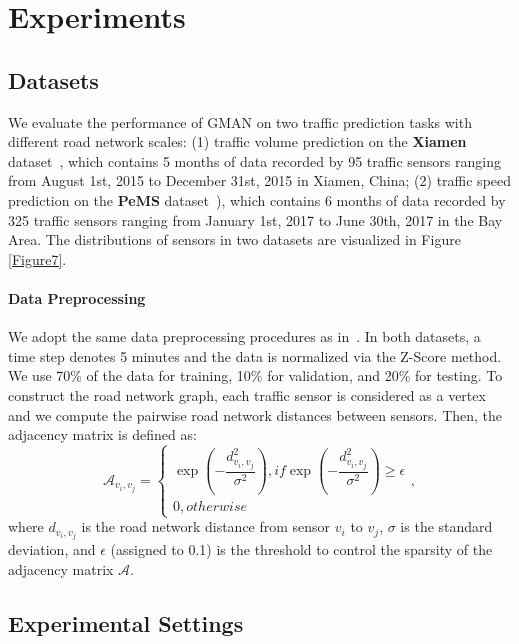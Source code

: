 \documentclass[letterpaper]{article} \usepackage{aaai20}  \usepackage{times}  \usepackage{helvet} \usepackage{courier}  \usepackage[hyphens]{url}  \usepackage{graphicx} \usepackage{amsmath}
\begin{document}
\section{Experiments}

\subsection{Datasets} \label{datasets}

We evaluate the performance of GMAN on two traffic prediction tasks with different road network scales: (1) traffic volume prediction on the \textbf{Xiamen} dataset~\cite{Wang-et-al:ICWS2017}, which contains 5 months of data recorded by 95 traffic sensors ranging from August 1st, 2015 to December 31st, 2015 in Xiamen, China; (2) traffic speed prediction on the \textbf{PeMS} dataset~\cite{Li-et-al:ICLR2018}), which contains 6 months of data recorded by 325 traffic sensors ranging from January 1st, 2017 to June 30th, 2017 in the Bay Area. The distributions of sensors in two datasets are visualized in Figure \ref{Figure7}.

\paragraph{Data Preprocessing} 
We adopt the same data preprocessing procedures as in~\cite{Li-et-al:ICLR2018}. In both datasets, a time step denotes 5 minutes and the data is normalized via the Z-Score method. We use 70\% of the data for training, 10\% for validation, and 20\% for testing. To construct the road network graph, each traffic sensor is considered as a vertex and we compute the pairwise road network distances between sensors. Then, the adjacency matrix is defined as:
\begin{equation}
\mathcal{A}_{v_i, v_j} = \left\{ 
\begin{array}{lr}
\exp ( -\dfrac{d_{v_i,v_j}^2}{\sigma^2} ), if \exp ( -\dfrac{d_{v_i,v_j}^2}{\sigma^2} ) \geq \epsilon \\
0, otherwise 
\end{array}
\label{adjacency_matrix},
\right.
\end{equation}
where $ {d_{v_i,v_j}} $ is the road network distance from sensor $ v_i $ to $ v_j $, $ \sigma $ is the standard deviation, and $ \epsilon $ (assigned to 0.1) is the threshold to control the sparsity of the adjacency matrix $ \mathcal{A} $.

\subsection{Experimental Settings}
\end{document}
